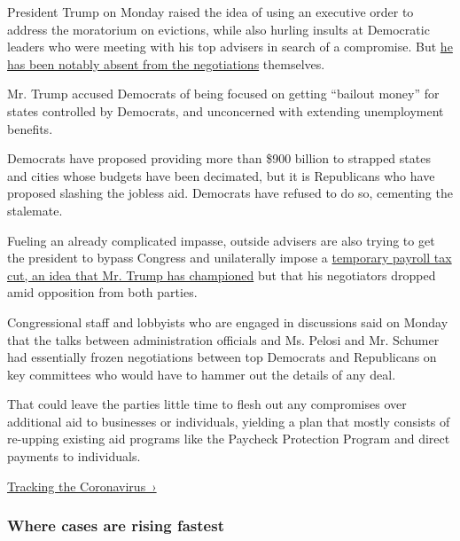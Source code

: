 President Trump on Monday raised the idea of using an executive order to
address the moratorium on evictions, while also hurling insults at
Democratic leaders who were meeting with his top advisers in search of a
compromise. But
\href{https://www.nytimes3xbfgragh.onion/2020/08/03/us/politics/congress-jobless-aid-talks-trump.html}{he
has been notably absent from the negotiations} themselves.

Mr. Trump accused Democrats of being focused on getting ``bailout
money'' for states controlled by Democrats, and unconcerned with
extending unemployment benefits.

Democrats have proposed providing more than \$900 billion to strapped
states and cities whose budgets have been decimated, but it is
Republicans who have proposed slashing the jobless aid. Democrats have
refused to do so, cementing the stalemate.

Fueling an already complicated impasse, outside advisers are also trying
to get the president to bypass Congress and unilaterally impose a
\href{https://www.nytimes3xbfgragh.onion/2020/07/23/business/payroll-tax-cut-trump-recession.html}{temporary
payroll tax cut, an idea that Mr. Trump has championed} but that his
negotiators dropped amid opposition from both parties.

Congressional staff and lobbyists who are engaged in discussions said on
Monday that the talks between administration officials and Ms. Pelosi
and Mr. Schumer had essentially frozen negotiations between top
Democrats and Republicans on key committees who would have to hammer out
the details of any deal.

That could leave the parties little time to flesh out any compromises
over additional aid to businesses or individuals, yielding a plan that
mostly consists of re-upping existing aid programs like the Paycheck
Protection Program and direct payments to individuals.

\href{https://www.nytimes3xbfgragh.onion/interactive/2020/us/coronavirus-us-cases.html}{Tracking
the Coronavirus~›}

\href{https://www.nytimes3xbfgragh.onion/interactive/2020/us/coronavirus-us-cases.html}{}

\hypertarget{where-cases-are-rising-fastest}{%
\subsubsection{\texorpdfstring{Where cases are \textbf{rising}
fastest}{Where cases are rising fastest}}\label{where-cases-are-rising-fastest}}

